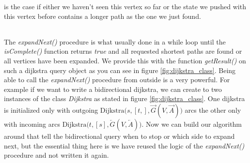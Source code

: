 is the case if either we haven't seen this vertex so far or the state we pushed with this vertex before contains a longer path as the one we just found.

\\
The \textit{expandNext()} procedure is what usually done in a while loop until the \textit{isComplete()} function returns \textit{true} and all requested shortest paths are found or all vertices have been expanded. We provide this with the function \textit{getResult()} 
on such a dijkstra query object as you can see in figure \ref{fig:dijkstra_class}. Being able to call the \textit{expandNext()} procedure from outside is a very powerful. For example if we want to write a bidirectional
dijkstra, we can create to two instances of the class \textit{Dijkstra} as stated in figure \ref{fig:dijkstra_class}. One dijkstra is initialized only with outgoing 
$\text{Dijkstra(}s, [t,], \overrightarrow{G}(V, \overrightarrow{A}) \text{)}$ arcs the other only with incoming arcs $\text{Dijkstra(}t, [s], \overleftarrow{G}(V, \overleftarrow{A}) \text{)}$. Now we can build our 
algorithm around that tell the bidirectional query when to stop or which side to expand next, but the essential thing here is we have reused the logic of the \textit{expandNext()} procedure and not written it again.



